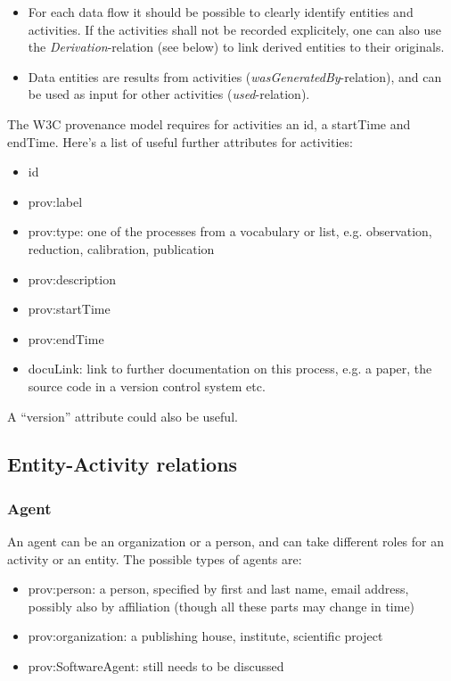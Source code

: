 \begin{itemize}
\item For each data flow it should be possible to clearly identify entities and activities. If the activities shall not be recorded explicitely, one can also use the \emph{Derivation}-relation (see below) to link derived entities to their originals.

\item Data entities are results from activities (\emph{wasGeneratedBy}-relation), and can be used as input for other activities (\emph{used}-relation). 

\end{itemize}

The W3C provenance model requires for activities an id, a startTime and endTime. 
Here's a list of useful further attributes for activities:

\begin{itemize}
\item id
\item prov:label
\item prov:type: one of the processes from a vocabulary or list, e.g. observation, reduction, calibration, publication
\item prov:description
\item prov:startTime
\item prov:endTime
\item docuLink: link to further documentation on this process, e.g. a paper, the source code in a version control system etc.
\end{itemize}

A ``version'' attribute could also be useful.

\subsection{Entity-Activity relations}\label{sec:entity-activity-relations}



\subsubsection{Agent}\label{sec:w3c-agent}
An agent can be an organization or a person, and can take different roles for an activity or an entity. The possible types of agents are:
\begin{itemize}
\item prov:person: a person, specified by first and last name, email address, possibly also by affiliation (though all these parts may change in time)
\item prov:organization: a publishing house, institute, scientific project
\item prov:SoftwareAgent: still needs to be discussed
\end{itemize}

